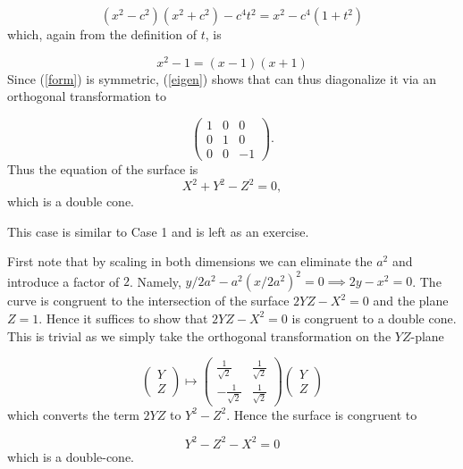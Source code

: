 \documentclass[12pt]{article}
\begin{document}
$$( x^2 - c^2)(x^2 + c^2) -  c^4 t^2 = x^2 - c^4(1 + t^2)$$
which, again from the definition of $t$, is

\begin{equation}\label{eigen} x^2  -1 = (x - 1)(x + 1)\end{equation}
Since (\ref{form}) is symmetric, (\ref{eigen}) shows that  can thus
diagonalize it via an orthogonal transformation to

$$\left(\begin{matrix}1 & 0 & 0 \\
0 & 1 & 0\\
0 & 0 & -1\end{matrix}\right).$$
Thus the equation of the surface is
$$X^2 + Y^2 - Z^2 = 0,$$
which is a double cone.

\medskip

 This case is similar to Case 1 and is left as an
exercise.

\medskip

 First note that by scaling in both dimensions
we can eliminate the $a^2$ and introduce a factor of $2$.  Namely,
$y/2a^2 - a^2(x/2a^2)^2  = 0\implies 2y
- x^2 = 0$.  The curve is congruent to the intersection of
the surface $2YZ - X^2 = 0$ and the plane $Z = 1$.  Hence it suffices
to show that $2YZ - X^2 = 0$ is congruent to a double cone.  This is
trivial as we simply take the orthogonal transformation on the
$YZ$-plane

$$\left(\begin{matrix}
Y\\
Z\end{matrix}\right) \mapsto
\left(\begin{matrix}
\frac{1}{\sqrt{2}} & \frac{1}{\sqrt{2}} \\
-\frac{1}{\sqrt{2}} & \frac{1}{\sqrt{2}}\end{matrix}
\right) \left(\begin{matrix}
Y\\Z\end{matrix}\right)$$
which converts the term $2YZ$ to $Y^2 - Z^2$.  Hence the surface is
congruent to 

$$Y^2 - Z^2 - X^2 = 0$$
which is a double-cone.
\end{document}

